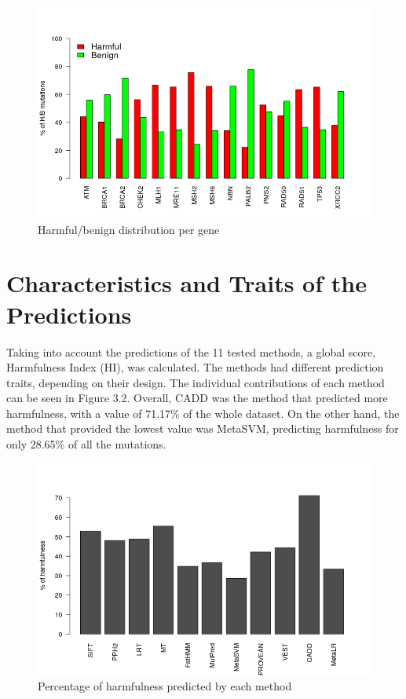 \documentclass[12pt,MSc,wordcount,anon]{muthesis}
\begin{document}
\begin{flushleft}
\begin{figure}
\begin{center}
\includegraphics[width=16cm]{img/mutations_per_gene}
\end{center}
\caption{Harmful/benign distribution per gene}
\label{fig:fig-eg}  
\end{figure}

\section{Characteristics and Traits of the Predictions}

Taking into account the predictions of the 11 tested methods, a global score, Harmfulness Index (HI), was calculated. The methods had different prediction traits, depending on their design. The individual contributions of each method can be seen in Figure 3.2. Overall, CADD was the method that predicted more harmfulness, with a value of 71.17\% of the whole dataset. On the other hand, the method that provided the lowest value was MetaSVM, predicting harmfulness for only 28.65\% of all the mutations.

\begin{figure}
\begin{center}
\includegraphics[width=14cm]{img/contribution_per_method}
\end{center}
\caption{Percentage of harmfulness predicted by each method}
\label{fig:fig-eg}  
\end{figure}


\end{flushleft}
\end{document}

